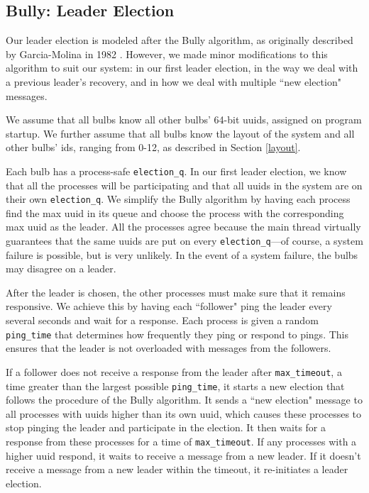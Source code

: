 \documentclass[preprint,review,12pt]{cs262}
\begin{document}
\subsection{Bully: Leader Election}

Our leader election is modeled after the Bully algorithm, as originally described by Garcia-Molina in 1982 \cite{garcia1982elections}. However, we made minor modifications to this algorithm to suit our system: in our first leader election, in the way we deal with a previous leader's recovery, and in how we deal with multiple ``new election" messages.

We assume that all bulbs know all other bulbs' 64-bit uuids, assigned on program startup. We further assume that all bulbs know the layout of the system and all other bulbs' ids, ranging from 0-12, as described in Section \ref{layout}. 

Each bulb has a process-safe  \texttt{election\_q}. In our first leader election, we know that all the processes will be participating and that all uuids in the system are on their own \texttt{election\_q}. We simplify the Bully algorithm by having each process find the max uuid in its queue and choose the process with the corresponding max uuid as the leader. All the processes agree because the main thread virtually guarantees that the same uuids are put on every \texttt{election\_q}---of course, a system failure is possible, but is very unlikely. In the event of a system failure, the bulbs may disagree on a leader. 

After the leader is chosen, the other processes must make sure that it remains responsive. We achieve this by having each ``follower" ping the leader every several seconds and wait for a response. Each process is given a random \texttt{ping\_time} that determines how frequently they ping or respond to pings. This ensures that the leader is not overloaded with messages from the followers.

If a follower does not receive a response from the leader after \texttt{max\_timeout}, a time greater than the largest possible \texttt{ping\_time}, it starts a new election that follows the procedure of the Bully algorithm. It sends a ``new election" message to all processes with uuids higher than its own uuid, which causes these processes to stop pinging the leader and participate in the election. It then waits for a response from these processes for a time of \texttt{max\_timeout}. If any processes with a higher uuid respond, it waits to receive a message from a new leader. If it doesn't receive a message from a new leader within the timeout, it re-initiates a leader election. 
\end{document}
